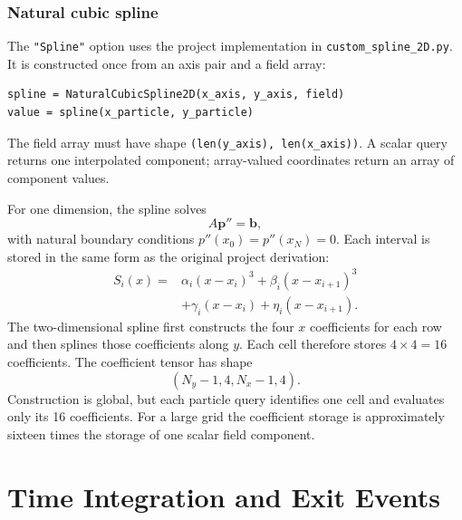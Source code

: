 \documentclass[11pt,a4paper]{report}
\newcommand{\code}[1]{\texttt{#1}}
\newcommand{\vect}[1]{\bm{#1}}
\begin{document}
\subsection{Natural cubic spline}
The \code{"Spline"} option uses the project implementation in
\code{custom\_spline\_2D.py}.  It is constructed once from an axis pair and a
field array:
\begin{lstlisting}
spline = NaturalCubicSpline2D(x_axis, y_axis, field)
value = spline(x_particle, y_particle)
\end{lstlisting}
The field array must have shape
\code{(len(y\_axis), len(x\_axis))}.  A scalar query returns one interpolated
component; array-valued coordinates return an array of component values.

For one dimension, the spline solves
\begin{equation}
  A\vect{p}''=\vect{b},
\end{equation}
with natural boundary conditions $p''(x_0)=p''(x_N)=0$.  Each interval is
stored in the same form as the original project derivation:
\begin{align}
S_i(x)={}&\alpha_i(x-x_i)^3+\beta_i(x-x_{i+1})^3\\
         &+\gamma_i(x-x_i)+\eta_i(x-x_{i+1}).
\end{align}
The two-dimensional spline first constructs the four $x$ coefficients for
each row and then splines those coefficients along $y$.  Each cell therefore
stores $4\times4=16$ coefficients.  The coefficient tensor has shape
\begin{equation}
  (N_y-1,4,N_x-1,4).
\end{equation}
Construction is global, but each particle query identifies one cell and
evaluates only its 16 coefficients.  For a large grid the coefficient storage
is approximately sixteen times the storage of one scalar field component.

\chapter{Time Integration and Exit Events}
\end{document}
